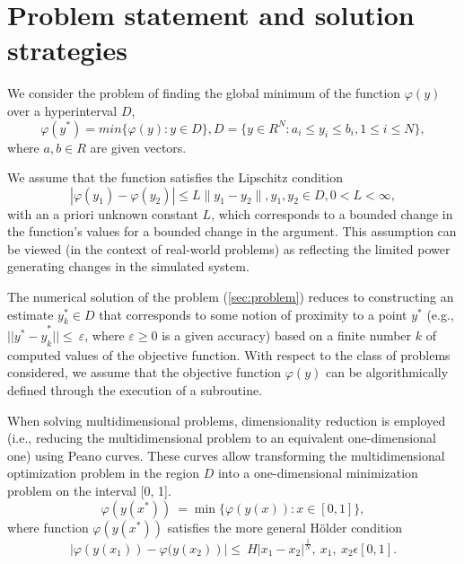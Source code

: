 \documentclass[runningheads]{llncs}
\begin{document}

\section{Problem statement and solution strategies}\label{SecA}

We consider the problem of finding the global minimum of the function $\varphi(y)$ over a hyperinterval $D$, 
\begin{equation} \label{sec:problem}   
	\varphi(y^*) = min\{\varphi(y):y\in D\}, D = \{y \in R^N : a_i \leq y_i \leq b_i, 1 \leq i \leq N \},
\end{equation}
where $a,b \in R$ are given vectors.

We assume that the function satisfies the Lipschitz condition 
\begin{displaymath} 
	|\varphi(y_1)-\varphi(y_2)|\leq L\parallel y_1-y_2 \parallel ,y_1,y_2 \in D, 0<L< \infty, 
\end{displaymath}
with an a priori unknown constant $L$, which corresponds to a bounded change in the function's values for a bounded change in the argument.
This assumption can be viewed (in the context of real-world problems) as reflecting the limited power generating changes in the simulated system.

The numerical solution of the problem (\ref{sec:problem}) reduces to constructing an estimate $y_k^\ast\in D$ that corresponds to some notion of proximity to a point $y^\ast$ (e.g., ${ ||y^\ast-y}_k^\ast||\le\ \varepsilon$, where $\varepsilon\geq0$ is a given accuracy) based on a finite number $k$ of computed values of the objective function. With respect to the class of problems considered, we assume that the objective function $\varphi(y)$ can be algorithmically defined through the execution of a subroutine.

When solving multidimensional problems, dimensionality reduction is employed (i.e., reducing the multidimensional problem to an equivalent one-dimensional one) using Peano curves. These curves allow transforming the multidimensional optimization problem in the region $D$ into a one-dimensional minimization problem on the interval [0, 1].
\begin{displaymath}
	\varphi(y(x^\ast))\ =\min\{\varphi(y(x)): x\in [0,1]\},
\end{displaymath}
where function $\varphi(y(x^\ast))$ satisfies the more general Hölder condition
\begin{displaymath}
	\left|\varphi (y \left(x_1\right))- \varphi (y \left(x_2\right)\right )|\le\ H\left|x_1-x_2\right|^\frac{1}{N},\ x_1,\ x_2\epsilon[0,1].
\end{displaymath} 
\end{document}
